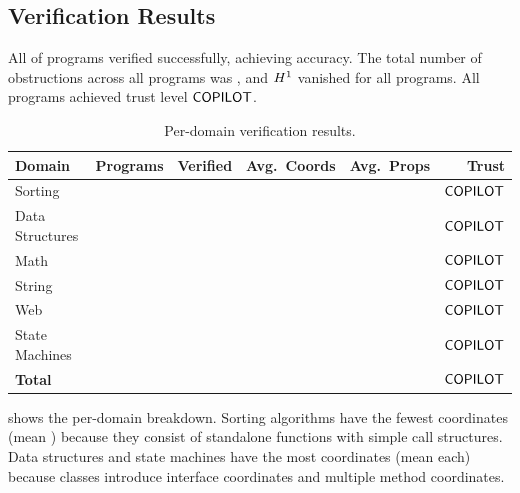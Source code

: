 \documentclass[11pt]{article}
\begin{document}
\subsection{Verification Results}

All \expVerified{} of \expTotalPrograms{} programs verified
successfully, achieving \expAccuracy{} accuracy.  The total number
of obstructions across all programs was \expObstructionTotal{}, and
$H^{1}$ vanished for all \expHOneZero{} programs.  All
\expTrustCOPILOTSUGGESTED{} programs achieved trust level
$\mathsf{COPILOT}$.

\begin{table}[t]
\centering
\caption{Per-domain verification results.}
\label{tab:per-domain}
\small
\begin{tabular}{@{}lrrrrr@{}}
\toprule
\textbf{Domain} & \textbf{Programs} & \textbf{Verified} &
\textbf{Avg.\ Coords} & \textbf{Avg.\ Props} & \textbf{Trust} \\
\midrule
Sorting & \expDomainSortCount{} & \expDomainSortVerified{} &
  \expDomainSortAvgCoords{} & \expDomainSortAvgProps{} & $\mathsf{COPILOT}$ \\
Data Structures & \expDomainDsCount{} & \expDomainDsVerified{} &
  \expDomainDsAvgCoords{} & \expDomainDsAvgProps{} & $\mathsf{COPILOT}$ \\
Math & \expDomainMathCount{} & \expDomainMathVerified{} &
  \expDomainMathAvgCoords{} & \expDomainMathAvgProps{} & $\mathsf{COPILOT}$ \\
String & \expDomainStrCount{} & \expDomainStrVerified{} &
  \expDomainStrAvgCoords{} & \expDomainStrAvgProps{} & $\mathsf{COPILOT}$ \\
Web & \expDomainWebCount{} & \expDomainWebVerified{} &
  \expDomainWebAvgCoords{} & \expDomainWebAvgProps{} & $\mathsf{COPILOT}$ \\
State Machines & \expDomainSmCount{} & \expDomainSmVerified{} &
  \expDomainSmAvgCoords{} & \expDomainSmAvgProps{} & $\mathsf{COPILOT}$ \\
\midrule
\textbf{Total} & \expTotalPrograms{} & \expVerified{} &
  \expCoordsMean{} & \expPropsMean{} & $\mathsf{COPILOT}$ \\
\bottomrule
\end{tabular}
\end{table}

 shows the per-domain breakdown.  Sorting
algorithms have the fewest coordinates (mean \expDomainSortAvgCoords{})
because they consist of standalone functions with simple call
structures.  Data structures and state machines have the most
coordinates (mean \expDomainDsAvgCoords{} each) because classes
introduce interface coordinates and multiple method coordinates.
\end{document}
